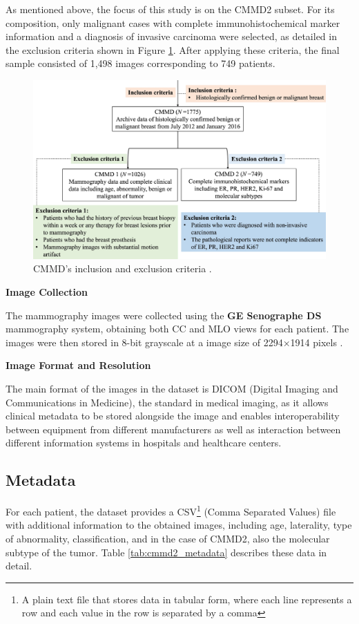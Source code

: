 \documentclass[a4paper,10pt]{book}
\begin{document}
As mentioned above, the focus of this study is on the CMMD2 subset. For its composition, only malignant cases with complete immunohistochemical marker information and a diagnosis of invasive carcinoma were selected, as detailed in the exclusion criteria shown in Figure \ref{fig:cmmd_criteria}. After applying these criteria, the final sample consisted of 1,498 images corresponding to 749 patients.

\begin{figure}[h]
	\centering
	\includegraphics[width=0.8\linewidth]{reports//assets/cmmd_criteria.png}
	\caption[CMMD's inclusion and exclusion criteria]{CMMD's inclusion and exclusion criteria \cite{cai_online_2023}.}
	\label{fig:cmmd_criteria}
\end{figure}

\textbf{Image Collection}

The mammography images were collected using the \textbf{GE Senographe DS} mammography system, obtaining both CC and MLO views for each patient. The images were then stored in 8-bit grayscale at a image size of 2294×1914 pixels \cite{cai_online_2023}.

\textbf{Image Format and Resolution}

The main format of the images in the dataset is DICOM (Digital Imaging and Communications in Medicine), the standard in medical imaging, as it allows clinical metadata to be stored alongside the image and enables interoperability between equipment from different manufacturers as well as interaction between different information systems in hospitals and healthcare centers.

\newpage
\subsection{Metadata}

For each patient, the dataset provides a CSV\footnote{A plain text file that stores data in tabular form, where each line represents a row and each value in the row is separated by a comma} (Comma Separated Values) file with additional information to the obtained images, including age, laterality, type of abnormality, classification, and in the case of CMMD2, also the molecular subtype of the tumor. Table \ref{tab:cmmd2_metadata} describes these data in detail.
\end{document}

